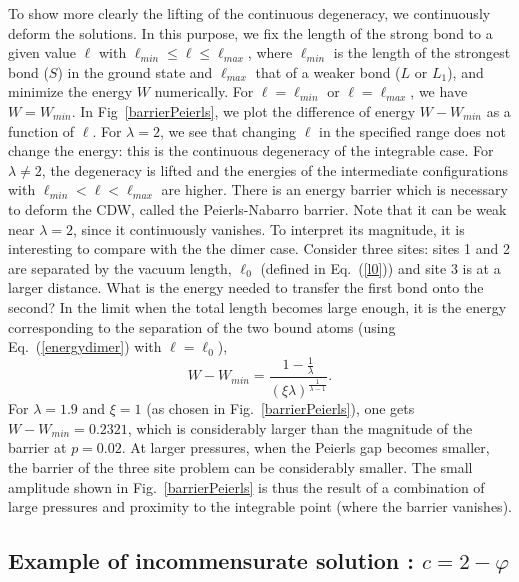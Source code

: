 \documentclass[]{revtex4-1}
\begin{document}
To show more clearly the lifting of the continuous degeneracy, we continuously deform the solutions.
In this purpose, we fix the length of the strong bond to a given value $\ell$ with $\ell_{min} \leq \ell \leq \ell_{max}$, where $\ell_{min}$ is the length of the strongest bond ($S$) in the ground state and $\ell_{max}$ that of a weaker bond ($L$ or $L_1$), and minimize the energy $W$ numerically. For $\ell=\ell_{min}$ or $\ell=\ell_{max}$, we have $W=W_{min}$.
In Fig~\ref{barrierPeierls}, we plot the difference of energy $W-W_{min}$ as a function of $\ell$. 
For $\lambda=2$, we see that changing $\ell$ in the specified range does not change the energy: this is the continuous degeneracy of the integrable case. For $\lambda \neq 2$, the degeneracy is lifted and the energies of the intermediate configurations with $\ell_{min}<\ell<\ell_{max}$ are higher. There is an energy barrier which is necessary to deform the CDW, called the Peierls-Nabarro barrier. Note that it can be weak near $\lambda=2$, since it continuously vanishes. To interpret its magnitude, it is interesting to compare with the the dimer case. Consider three sites: sites 1 and 2 are separated by the vacuum length, $\ell_0$ (defined in Eq.~(\ref{l0})) and site 3 is at a larger distance. What is the energy needed to transfer the first bond onto the second? In the limit when the total length becomes large enough, it is the energy corresponding to the separation of the two bound atoms (using Eq.~(\ref{energydimer}) with $\ell=\ell_0$),
\begin{equation}
W -W_{min}= \frac{1-\frac{1}{\lambda}}{(\xi \lambda)^{\frac{1}{\lambda-1}}}.
\end{equation}
For $\lambda=1.9$ and $\xi=1$ (as chosen in Fig.~\ref{barrierPeierls}), one gets $W-W_{min}=0.2321$, which is considerably larger than the magnitude of the barrier at $p=0.02$. At larger pressures, when the Peierls gap becomes smaller, the barrier of the three site problem can be considerably smaller. The small amplitude shown in Fig.~\ref{barrierPeierls} is thus the result of a combination of large pressures and proximity to the integrable point (where the barrier vanishes).


\subsection{Example of incommensurate solution : $c=2-\varphi$}
\label{incommensuratecase}
\end{document}
